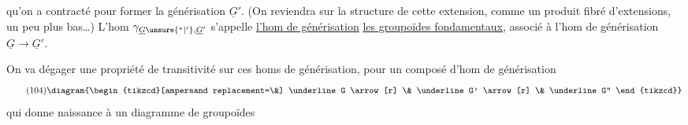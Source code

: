 qu'on a contracté pour former la générisation $\underline G'$.  (On reviendra sur la structure de cette extension, comme un produit fibré d'extensions, un peu plus bas\ldots) L'hom $\gamma_{\underline G\unsure{{}^*|{}'},\underline G'}$ s'appelle \uline{l'hom de générisation}  \uline{les groupoïdes fondamentaux}, associé à l'hom de générisation $\underline G\to\underline G'$.

On va dégager une propriété de transitivité sur ces homs de générisation, pour un composé d'hom de générisation
\[
\tag{104}
\diagram{\begin{tikzcd}[ampersand replacement=\&]
\underline G \arrow[r] \& \underline G' \arrow[r] \& \underline G''
\end{tikzcd}}
\]
qui donne naissance à un diagramme de groupoïdes
